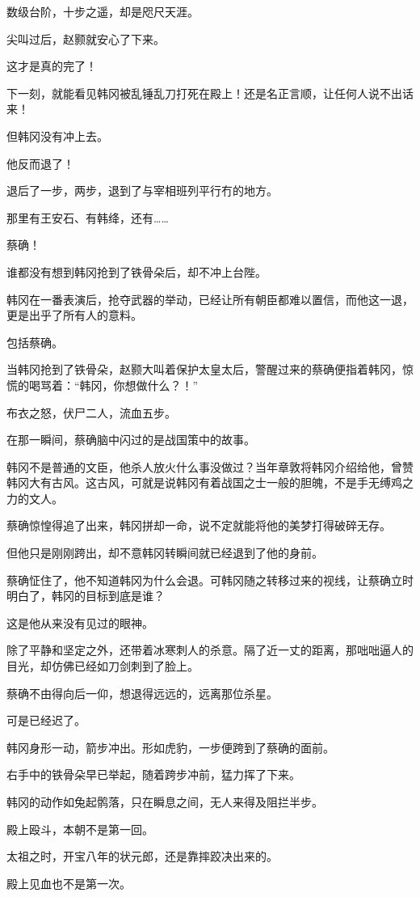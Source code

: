 数级台阶，十步之遥，却是咫尺天涯。

尖叫过后，赵颢就安心了下来。

这才是真的完了！

下一刻，就能看见韩冈被乱锤乱刀打死在殿上！还是名正言顺，让任何人说不出话来！

但韩冈没有冲上去。

他反而退了！

退后了一步，两步，退到了与宰相班列平行冇的地方。

那里有王安石、有韩绛，还有……

蔡确！

谁都没有想到韩冈抢到了铁骨朵后，却不冲上台陛。

韩冈在一番表演后，抢夺武器的举动，已经让所有朝臣都难以置信，而他这一退，更是出乎了所有人的意料。

包括蔡确。

当韩冈抢到了铁骨朵，赵颢大叫着保护太皇太后，警醒过来的蔡确便指着韩冈，惊慌的喝骂着：“韩冈，你想做什么？！”

布衣之怒，伏尸二人，流血五步。

在那一瞬间，蔡确脑中闪过的是战国策中的故事。

韩冈不是普通的文臣，他杀人放火什么事没做过？当年章敦将韩冈介绍给他，曾赞韩冈大有古风。这古风，可就是说韩冈有着战国之士一般的胆魄，不是手无缚鸡之力的文人。

蔡确惊惶得追了出来，韩冈拼却一命，说不定就能将他的美梦打得破碎无存。

但他只是刚刚跨出，却不意韩冈转瞬间就已经退到了他的身前。

蔡确怔住了，他不知道韩冈为什么会退。可韩冈随之转移过来的视线，让蔡确立时明白了，韩冈的目标到底是谁？

这是他从来没有见过的眼神。

除了平静和坚定之外，还带着冰寒刺人的杀意。隔了近一丈的距离，那咄咄逼人的目光，却仿佛已经如刀剑刺到了脸上。

蔡确不由得向后一仰，想退得远远的，远离那位杀星。

可是已经迟了。

韩冈身形一动，箭步冲出。形如虎豹，一步便跨到了蔡确的面前。

右手中的铁骨朵早已举起，随着跨步冲前，猛力挥了下来。

韩冈的动作如兔起鹘落，只在瞬息之间，无人来得及阻拦半步。

殿上殴斗，本朝不是第一回。

太祖之时，开宝八年的状元郎，还是靠摔跤决出来的。

殿上见血也不是第一次。

